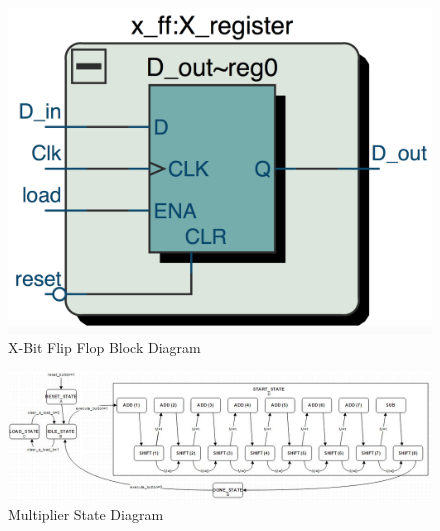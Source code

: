 \documentclass[journal, twocolumn, final,11pt,letterpaper]{IEEEtran}
\begin{document}
\begin{figure} [htbp]
	\centering
	\includegraphics[scale=0.4]{x-ff-diagram.png}
	\caption{X-Bit Flip Flop Block Diagram\label{fig:x-ff-diagram}}
\end{figure}

\begin{figure} [htbp]
	\centering
	\includegraphics[scale=0.65]{FSM.jpg}
	\caption{Multiplier State Diagram\label{fig:FSM}}
\end{figure}




\end{document}
